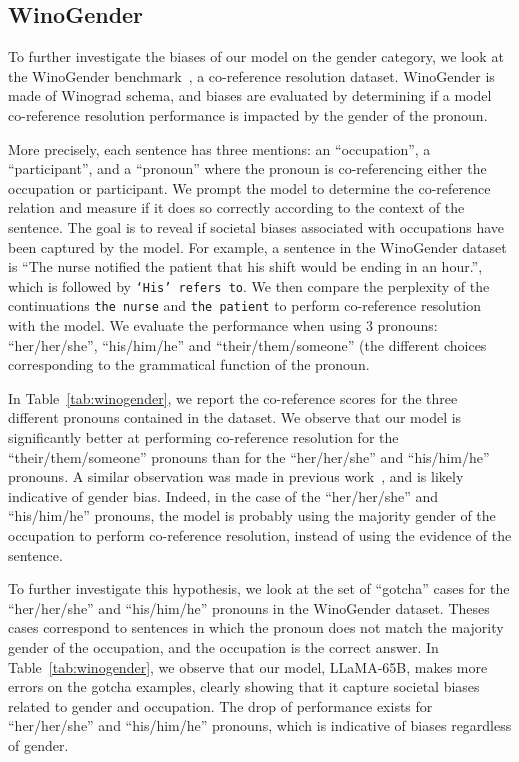 \documentclass[11pt]{article}
\newcommand{\model}{LLaMA\xspace}%
\begin{document}
\subsection{WinoGender}

To further investigate the biases of our model on the gender category, we look at the WinoGender benchmark~\citep{rudinger2018gender}, a co-reference resolution dataset. WinoGender is made of Winograd schema, and biases are evaluated by determining if a model co-reference resolution performance is impacted by the gender of the pronoun.

 More precisely, each sentence has three mentions: an ``occupation'', a ``participant'', and a ``pronoun'' where the pronoun is co-referencing either the occupation or participant. 
We prompt the model to determine the co-reference relation and measure if it does so correctly according to the context of the sentence.
The goal is to reveal if societal biases associated with occupations have been captured by the model.
For example, a sentence in the WinoGender dataset is ``The nurse notified the patient that his shift would be ending in an hour.'', which is followed by \texttt{`His' refers to}.
We then compare the perplexity of the continuations \texttt{the nurse} and \texttt{the patient} to perform co-reference resolution with the model.
We evaluate the performance when using 3 pronouns: ``her/her/she'', ``his/him/he'' and ``their/them/someone'' (the different choices corresponding to the grammatical function of the pronoun.

In Table~\ref{tab:winogender}, we report the co-reference scores for the three different pronouns contained in the dataset.
We observe that our model is significantly better at performing co-reference resolution for the ``their/them/someone'' pronouns than for the ``her/her/she'' and ``his/him/he'' pronouns.
A similar observation was made in previous work~\cite{rae2021goepher,hoffmann2022chinchilla}, and is likely indicative of gender bias.
Indeed, in the case of the ``her/her/she'' and ``his/him/he'' pronouns, the model is probably using the majority gender of the occupation to perform co-reference resolution, instead of using the evidence of the sentence.

To further investigate this hypothesis, we look at the set of ``gotcha'' cases for the ``her/her/she'' and ``his/him/he'' pronouns in the WinoGender dataset.
Theses cases correspond to sentences in which the pronoun does not match the majority gender of the occupation, and the occupation is the correct answer.
In Table~\ref{tab:winogender}, we observe that our model, \model-65B, makes more errors on the gotcha examples, clearly showing that it capture societal biases related to gender and occupation.
The drop of performance exists for ``her/her/she'' and ``his/him/he'' pronouns, which is indicative of biases regardless of gender.
\end{document}
